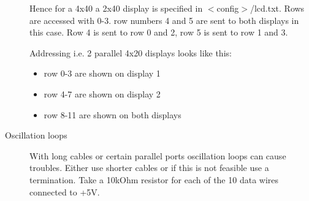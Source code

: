 \begin{description}
  Hence for a 4x40 a 2x40 display is specified in $<$config$>$/lcd.txt.
  Rows are accessed with 0-3. row numbers 4 and 5 are sent to both displays 
  in this case. Row 4 is sent to row 0 and 2,
  row 5 is sent to row 1 and 3.

  Addressing i.e. 2 parallel 4x20 displays looks like this:

  \begin{itemize}
  \item row 0-3 are shown on display 1
    
  \item  row 4-7 are shown on display 2 
    
  \item row 8-11 are shown on both displays 
  \end{itemize}


 \item [Oscillation loops]

  With long cables or certain parallel ports oscillation loops can cause troubles. 
  Either use shorter cables or if this is not feasible use a termination. Take 
  a 10kOhm resistor for each of the 10 data wires connected to +5V. 
  
\end{description}

